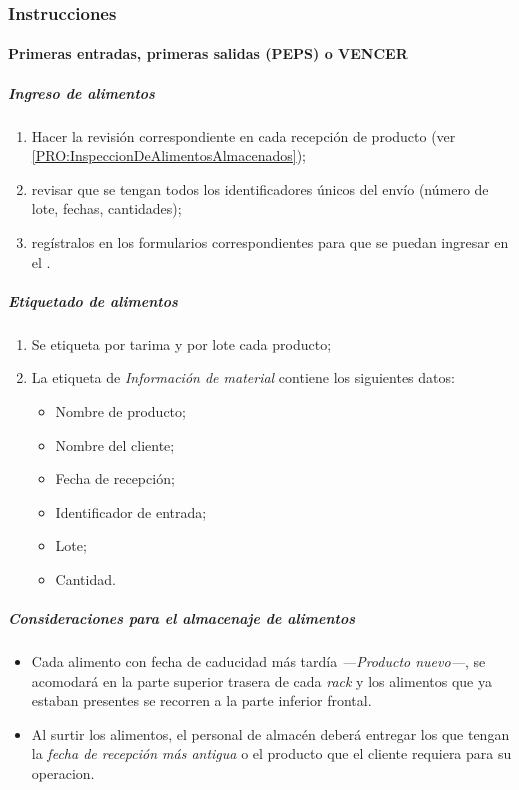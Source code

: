 \subsubsection{Instrucciones}
\paragraph{Primeras entradas, primeras salidas (PEPS) o VENCER}

\subparagraph{Ingreso de alimentos}
\begin{enumerate}
	\item Hacer la revisión correspondiente en cada recepción de producto (ver \cref{PRO:InspeccionDeAlimentosAlmacenados});
	\item revisar que se tengan todos los identificadores únicos del envío (número de lote, fechas, cantidades);
	\item regístralos en los formularios correspondientes para que se puedan ingresar en el .
\end{enumerate}

\subparagraph{Etiquetado de alimentos}
\begin{enumerate}
	\item Se etiqueta por tarima y por lote cada producto;
	\item La etiqueta de \emph{Información de material} contiene los siguientes datos:
	\begin{itemize}
		\item Nombre de producto;
		\item Nombre del cliente;
		\item Fecha de recepción;
		\item Identificador de entrada;
		\item Lote;
		\item Cantidad.
	\end{itemize}
\end{enumerate}

\subparagraph{Consideraciones para el almacenaje de alimentos}
\begin{itemize}
	\item Cada \gls{alimento} con fecha de caducidad más tardía \emph{---Producto nuevo---}, se acomodará en la parte superior trasera de cada \textit{rack} y los \glspl{alimento} que ya estaban presentes se recorren a la parte inferior frontal.
	\item Al surtir los \glspl{alimento}, el personal de almacén deberá entregar los que tengan la \emph{fecha de recepción más antigua} o el producto que el cliente requiera para su operacion.
\end{itemize}

